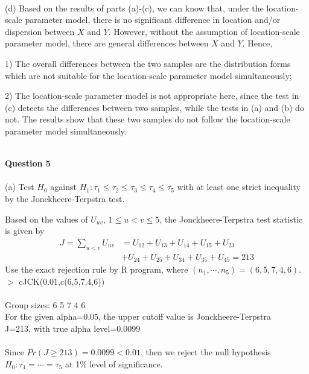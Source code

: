 \documentclass[12pt,a4paper]{article}
\begin{document}
~\\
(d) Based on the results of parts (a)-(c), we can know that, under the location-scale parameter model, there is no significant difference in location and/or dispersion between $X$ and $Y$. However, without the assumption of location-scale parameter model, there are general differences between $X$ and $Y$. Hence,

1) The overall differences between the two samples are the distribution forms which are not suitable for the location-scale parameter model simultaneously;

2) The location-scale parameter model is not appropriate here, since the test in (c) detects the differences between two samples, while the tests in (a) and (b) do not. The results show that these two samples do not follow the location-scale parameter model simultaneously.

~\\
\indent \textbf{Question 5}\\
~\\
(a) Test $H_{0}$ against $H_{1}:\tau_{1}\leqslant\tau_{2}\leqslant\tau_{3}\leqslant\tau_{4}\leqslant\tau_{5}$ with at least one strict inequality by the Jonckheere-Terpstra test.

Based on the values of $U_{uv}$, $1\leqslant u<v\leqslant 5$, the Jonckheere-Terpstra test statistic is given by 
\begin{align*}
J=\sum_{u<v}U_{uv}&=U_{12}+U_{13}+U_{14}+U_{15}+U_{23}\\
&+U_{24}+U_{25}+U_{34}+U_{35}+U_{45}=213
\end{align*}
Use the exact rejection rule by R program, where $(n_{1},\cdots,n_{5})=(6,5,7,4,6)$.\\

\indent $>$ cJCK(0.01,c(6,5,7,4,6))\\
~\\
\indent Group sizes: 6 5 7 4 6\\
\indent For the given alpha=0.05, the upper cutoff value is Jonckheere-Terpstra\\
\indent J=213, with true alpha level=0.0099\\
~\\
Since $Pr(J\geqslant213)=0.0099<0.01$, then we reject the null hypothesis $H_{0}:\tau_{1}=\cdots=\tau_{5}$ at 1\% level of significance.
\end{document}
